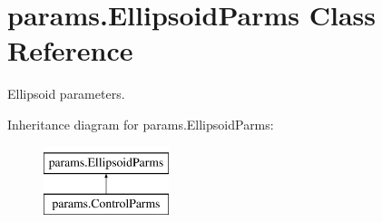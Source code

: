 \hypertarget{classparams_1_1_ellipsoid_parms}{}\section{params.\+Ellipsoid\+Parms Class Reference}
\label{classparams_1_1_ellipsoid_parms}


Ellipsoid parameters.  


Inheritance diagram for params.\+Ellipsoid\+Parms\+:\begin{figure}[H]
\begin{center}
\leavevmode
\includegraphics[height=2.000000cm]{classparams_1_1_ellipsoid_parms}
\end{center}
\end{figure}

